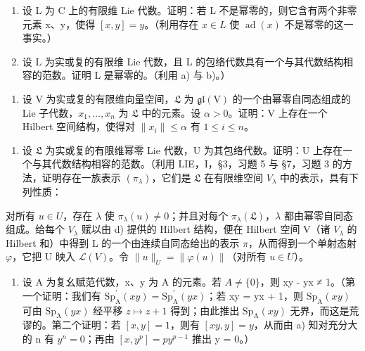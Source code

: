 \begin{enumerate}
\def\labelenumi{\alph{enumi})}
\setcounter{enumi}{1}
\item
  设 L 为 C 上的有限维 Lie 代数。证明：若 L 不是幂零的，则它含有两个非零元素 x、y，使得 \([x, y] = y\)。（利用存在 \(x \in L\) 使 \(\operatorname{ad}(x)\) 不是幂零的这一事实。）
\item
  设 L 为实或复的有限维 Lie 代数，且 L 的包络代数具有一个与其代数结构相容的范数。证明 L 是幂零的。（利用 a) 与 b)。）
\end{enumerate}

\begin{enumerate}
\def\labelenumi{\alph{enumi})}
\setcounter{enumi}{3}
\tightlist
\item
  设 V 为实或复的有限维向量空间，\(\mathfrak{L}\) 为 \(\mathfrak{gl}(\mathrm{V})\) 的一个由幂零自同态组成的 Lie 子代数，\(x_{1},\ldots ,x_{n}\) 为 \(\mathfrak{L}\) 中的元素。设 \(\alpha >0\)。证明：V 上存在一个 Hilbert 空间结构，使得对 \(\| x_i\| \leqslant \alpha\) 有 \(1\leqslant i\leqslant n\)。
\end{enumerate}

\begin{enumerate}
\def\labelenumi{\alph{enumi})}
\setcounter{enumi}{4}
\tightlist
\item
  设 \(\mathfrak{L}\) 为实或复的有限维幂零 Lie 代数，U 为其包络代数。证明：U 上存在一个与其代数结构相容的范数。（利用 LIE，I，§3，习题 5 与 §7，习题 3 的方法，证明存在一族表示 \((\pi_{\lambda})\)，它们是 \(\mathfrak{L}\) 在有限维空间 \(V_{\lambda}\) 中的表示，具有下列性质：
\end{enumerate}

对所有 \(u \in U\)，存在 \(\lambda\) 使 \(\pi_{\lambda}(u) \neq 0\)；并且对每个 \(\pi_{\lambda}(\mathfrak{L})\)，\(\lambda\) 都由幂零自同态组成。给每个 \(V_{\lambda}\) 赋以由 d) 提供的 Hilbert 结构，便在 Hilbert 空间 V（诸 \(V_{\lambda}\) 的 Hilbert 和）中得到 L 的一个由连续自同态给出的表示 \(\pi\)，从而得到一个单射态射 \(\varphi\)，它把 U 映入 \(\mathcal{L}(V)\)。令 \(\|u\|_{U} = \|\varphi(u)\|\)（对所有 \(u \in U\)）。

\begin{enumerate}
\def\labelenumi{\alph{enumi})}
\setcounter{enumi}{5}
\tightlist
\item
  设 A 为复幺赋范代数，x、y 为 A 的元素。若 \(A \neq \{0\}\)，则 xy - yx ≠ 1。（第一个证明：我们有 \(\mathrm{Sp}_{\mathrm{A}}^{\prime}(xy) = \mathrm{Sp}_{\mathrm{A}}^{\prime}(yx)\)；若 xy = yx + 1，则 \(\mathrm{Sp}_{\mathrm{A}}(xy)\) 可由 \(\mathrm{Sp}_{\mathrm{A}}(yx)\) 经平移 \(z \mapsto z + 1\) 得到；由此推出 \(\mathrm{Sp}_{\mathrm{A}}(xy)\) 无界，而这是荒谬的。第二个证明：若 \([x, y] = 1\)，则有 \([xy, y] = y\)，从而由 a) 知对充分大的 n 有 \(y^{n} = 0\)；再由 \([x, y^{p}] = py^{p-1}\) 推出 y = 0。）
\end{enumerate}

